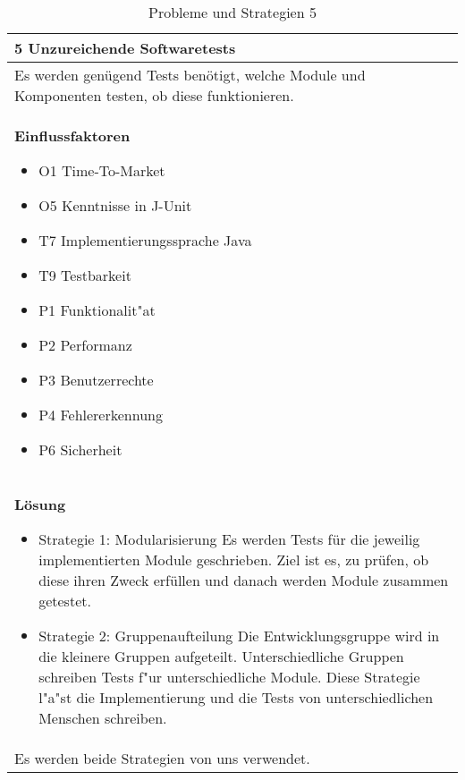 \begin{table}[H]
\caption{Probleme und Strategien 5}
\begin{tabular}{|p{\textwidth}|}\hline
5 Unzureichende Softwaretests\\ \hline
Es werden genügend Tests benötigt, welche Module und Komponenten testen, ob diese funktionieren.\\ \hline
\textbf{Einflussfaktoren}
\begin{itemize}
\item O1 Time-To-Market
\item O5 Kenntnisse in J-Unit
\item T7 Implementierungssprache Java
\item T9 Testbarkeit
\item P1 Funktionalit"at
\item P2 Performanz
\item P3 Benutzerrechte
\item P4 Fehlererkennung
\item P6 Sicherheit
\end{itemize}\\ \hline
\textbf{Lösung}
\begin{itemize}
\item Strategie 1: Modularisierung \leavevmode\newline
Es werden Tests für die jeweilig implementierten Module geschrieben. Ziel ist es, zu prüfen, ob diese ihren Zweck erfüllen und danach werden Module zusammen getestet. 
\item Strategie 2: Gruppenaufteilung \leavevmode\newline
Die Entwicklungsgruppe wird in die kleinere Gruppen aufgeteilt. Unterschiedliche Gruppen schreiben Tests f"ur unterschiedliche Module. Diese Strategie l"a"st die Implementierung und die Tests von unterschiedlichen Menschen schreiben.
\end{itemize} \\ \hline
Es werden beide Strategien von uns verwendet.
\end{tabular}
\end{table}

